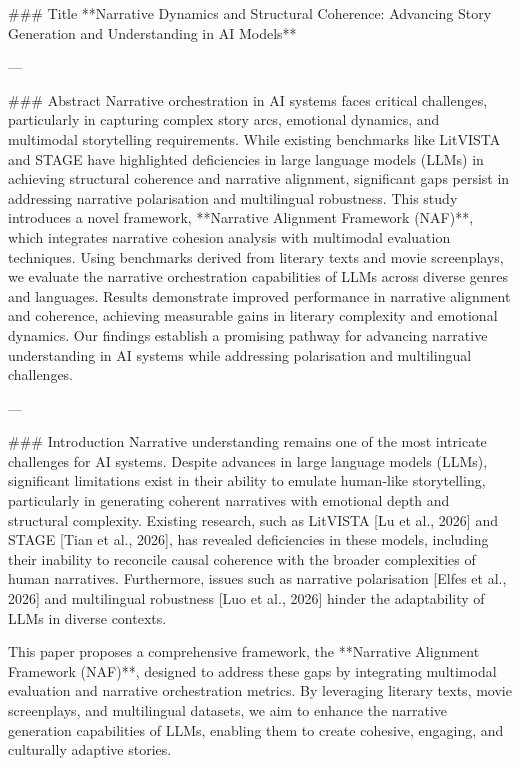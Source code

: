 ### Title  
**Narrative Dynamics and Structural Coherence: Advancing Story Generation and Understanding in AI Models**

---

### Abstract  
Narrative orchestration in AI systems faces critical challenges, particularly in capturing complex story arcs, emotional dynamics, and multimodal storytelling requirements. While existing benchmarks like LitVISTA and STAGE have highlighted deficiencies in large language models (LLMs) in achieving structural coherence and narrative alignment, significant gaps persist in addressing narrative polarisation and multilingual robustness. This study introduces a novel framework, **Narrative Alignment Framework (NAF)**, which integrates narrative cohesion analysis with multimodal evaluation techniques. Using benchmarks derived from literary texts and movie screenplays, we evaluate the narrative orchestration capabilities of LLMs across diverse genres and languages. Results demonstrate improved performance in narrative alignment and coherence, achieving measurable gains in literary complexity and emotional dynamics. Our findings establish a promising pathway for advancing narrative understanding in AI systems while addressing polarisation and multilingual challenges.

---

### Introduction  
Narrative understanding remains one of the most intricate challenges for AI systems. Despite advances in large language models (LLMs), significant limitations exist in their ability to emulate human-like storytelling, particularly in generating coherent narratives with emotional depth and structural complexity. Existing research, such as LitVISTA [Lu et al., 2026] and STAGE [Tian et al., 2026], has revealed deficiencies in these models, including their inability to reconcile causal coherence with the broader complexities of human narratives. Furthermore, issues such as narrative polarisation [Elfes et al., 2026] and multilingual robustness [Luo et al., 2026] hinder the adaptability of LLMs in diverse contexts.  

This paper proposes a comprehensive framework, the **Narrative Alignment Framework (NAF)**, designed to address these gaps by integrating multimodal evaluation and narrative orchestration metrics. By leveraging literary texts, movie screenplays, and multilingual datasets, we aim to enhance the narrative generation capabilities of LLMs, enabling them to create cohesive, engaging, and culturally adaptive stories.

